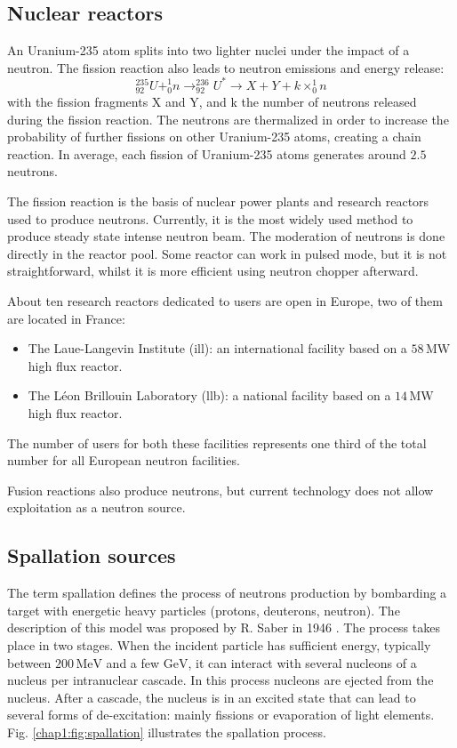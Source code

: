 \begin{refsection}
  \subsection{Nuclear reactors}
  An Uranium-235 atom splits into two lighter nuclei under the impact of a neutron. The fission reaction also leads to neutron emissions and energy release:
  \begin{equation*}
    _{92}^{235}U + _{0}^{1}n \rightarrow _{92}^{236}U^* \rightarrow X + Y + k \times _{0}^{1}n
  \end{equation*}
  with the fission fragments X and Y, and k the number of neutrons released during the fission reaction. The neutrons are thermalized in order to increase the probability of further fissions on other Uranium-235 atoms, creating a chain reaction. In average, each fission of Uranium-235 atoms generates around $2.5$ neutrons.

  The fission reaction is the basis of nuclear power plants and research reactors used to produce neutrons.
  Currently, it is the most widely used method to produce steady state intense neutron beam. The moderation of neutrons is done directly in the reactor pool.
  Some reactor can work in pulsed mode, but it is not straightforward, whilst it is more efficient using neutron chopper afterward.

  About ten research reactors dedicated to users are open in Europe, two of them are located in France:
  \begin{itemize}
    \item The Laue-Langevin Institute (\acrshort{ill}): an international facility based on a $58\,\mathrm{MW}$ high flux reactor.
    \item The Léon Brillouin Laboratory (\acrshort{llb}): a national facility based on a $14\,\mathrm{MW}$ high flux reactor.
  \end{itemize}
  The number of users for both these facilities represents one third of the total number for all European neutron facilities.

  Fusion reactions also produce neutrons, but current technology does not allow exploitation as a neutron source.

  \subsection{Spallation sources}
  The term spallation defines the process of neutrons production by bombarding a target with energetic heavy particles (protons, deuterons, neutron). The description of this model was proposed by R. Saber in 1946 \cite{PhysRev.72.1114}. The process takes place in two stages. When the incident particle has sufficient energy, typically between $200\,\mathrm{MeV}$ and a few $\mathrm{GeV}$, it can interact with several nucleons of a nucleus per intranuclear cascade. In this process nucleons are ejected from the nucleus. After a cascade, the nucleus is in an excited state that can lead to several forms of de-excitation: mainly fissions or evaporation of light elements. Fig. \ref{chap1:fig:spallation} illustrates the spallation process.


\end{refsection}
